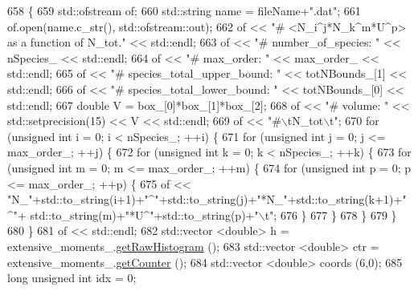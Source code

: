 \begin{DoxyCode}
658                                                                                \{
659     std::ofstream of;
660     std::string name = fileName+\textcolor{stringliteral}{".dat"};
661     of.open(name.c\_str(), std::ofstream::out);
662     of << \textcolor{stringliteral}{"# <N\_i^j*N\_k^m*U^p> as a function of N\_tot."} << std::endl;
663     of << \textcolor{stringliteral}{"# number\_of\_species: "} << nSpecies\_ << std::endl;
664     of << \textcolor{stringliteral}{"# max\_order: "} << max\_order\_ << std::endl;
665     of << \textcolor{stringliteral}{"# species\_total\_upper\_bound: "} << totNBounds\_[1] << std::endl;
666     of << \textcolor{stringliteral}{"# species\_total\_lower\_bound: "} << totNBounds\_[0] << std::endl;
667     \textcolor{keywordtype}{double} V = box\_[0]*box\_[1]*box\_[2];
668     of << \textcolor{stringliteral}{"# volume: "} << std::setprecision(15) << V << std::endl;
669     of << \textcolor{stringliteral}{"#\(\backslash\)tN\_tot\(\backslash\)t"};
670     \textcolor{keywordflow}{for} (\textcolor{keywordtype}{unsigned} \textcolor{keywordtype}{int} i = 0; i < nSpecies\_; ++i) \{
671         \textcolor{keywordflow}{for} (\textcolor{keywordtype}{unsigned} \textcolor{keywordtype}{int} j = 0; j <= max\_order\_; ++j) \{
672             \textcolor{keywordflow}{for} (\textcolor{keywordtype}{unsigned} \textcolor{keywordtype}{int} k = 0; k < nSpecies\_; ++k) \{
673                 \textcolor{keywordflow}{for} (\textcolor{keywordtype}{unsigned} \textcolor{keywordtype}{int} m = 0; m <= max\_order\_; ++m) \{
674                     \textcolor{keywordflow}{for} (\textcolor{keywordtype}{unsigned} \textcolor{keywordtype}{int} p = 0; p <= max\_order\_; ++p) \{
675                         of << \textcolor{stringliteral}{"N\_"}+std::to\_string(i+1)+\textcolor{stringliteral}{"^"}+std::to\_string(j)+\textcolor{stringliteral}{"*N\_"}+std::to\_string(k+1)+\textcolor{stringliteral}{"^"}+
      std::to\_string(m)+\textcolor{stringliteral}{"*U^"}+std::to\_string(p)+\textcolor{stringliteral}{"\(\backslash\)t"};
676                     \}
677                 \}
678             \}
679         \}
680     \}
681     of << std::endl;
682     std::vector <double> h = extensive\_moments\_.\hyperlink{classhistogram_afa81289dc32207eb3c44f8bd746f0d1d}{getRawHistogram} ();
683     std::vector <double> ctr = extensive\_moments\_.\hyperlink{classhistogram_a7d3541bd86551053f9fda7b5ae81e3e8}{getCounter} ();
684     std::vector <double> coords (6,0);
685     \textcolor{keywordtype}{long} \textcolor{keywordtype}{unsigned} \textcolor{keywordtype}{int} idx = 0;

\end{DoxyCode}

